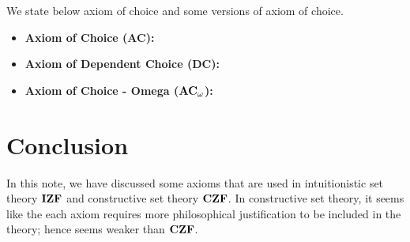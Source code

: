 \documentclass[12pt, a4paper]{article}
\theoremstyle{definition}
\theoremstyle{plain}
\begin{document}
We state below axiom of choice and some versions of axiom of choice.
\begin{itemize}
\item {\bf Axiom of Choice (AC):}
\item {\bf Axiom of Dependent Choice (DC):}
\item {\bf Axiom of Choice - Omega (${\bf AC_\omega}$):}
\end{itemize}

\section{Conclusion}

In this note, we have discussed some axioms that are used in intuitionistic set theory ${\bf IZF}$ and constructive set theory ${\bf CZF}$.
In constructive set theory, it seems like the each axiom requires more philosophical justification to be included in the theory; hence seems weaker than ${\bf CZF}$.
\end{document}
